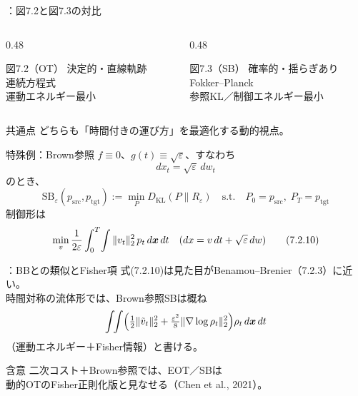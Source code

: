\begin{frame}{\supplmark：図7.2と図7.3の対比}
    \begin{columns}[T,onlytextwidth]
        \begin{column}{0.48\textwidth}
            \begin{block}{図7.2（OT）}
                決定的・直線軌跡\\
                連続方程式\\
                運動エネルギー最小
            \end{block}
        \end{column}
        \begin{column}{0.48\textwidth}
            \begin{block}{図7.3（SB）}
                確率的・揺らぎあり\\
                Fokker--Planck\\
                参照KL／制御エネルギー最小
            \end{block}
        \end{column}
    \end{columns}
    \vspace{0.4em}
    \begin{exampleblock}{共通点}
        どちらも「時間付きの運び方」を最適化する動的視点。
    \end{exampleblock}
\end{frame}
\asmain
\begin{frame}{特殊例：Brown参照}
    $f\equiv 0$、$g(t)\equiv\sqrt{\varepsilon}$、すなわち
    \[
        dx_{t}=\sqrt{\varepsilon}\,dw_{t}
    \]
    のとき、
    \[
        \mathrm{SB}_{\varepsilon}(p_{\mathrm{src}},p_{\mathrm{tgt}})
        :=
        \min_{P}
        D_{\mathrm{KL}}(P\|R_{\varepsilon})
        \quad\text{s.t.}\quad
        P_{0}=p_{\mathrm{src}},\;
        P_{T}=p_{\mathrm{tgt}}
        \tag{7.2.9}
    \]
    制御形は
    \[
        \min_{v}
        \frac{1}{2\varepsilon}
        \int_{0}^{T}\!\int \|v_{t}\|_{2}^{2}\,p_{t}\,d\bm{x}\,dt
        \quad
        (dx=v\,dt+\sqrt{\varepsilon}\,dw)
        \tag{7.2.10}
    \]
\end{frame}
\assuppl
\begin{frame}{\supplmark：BBとの類似とFisher項}
    式(7.2.10)は見た目がBenamou--Brenier（7.2.3）に近い。\\
    時間対称の流体形では、Brown参照SBは概ね
    \[
        \int\!\!\int
        \Bigl(
        \tfrac12\|\tilde{v}_{t}\|_{2}^{2}
        +
        \tfrac{\varepsilon^{2}}{8}\|\nabla\log\rho_{t}\|_{2}^{2}
        \Bigr)
        \rho_{t}\,d\bm{x}\,dt
    \]
    （運動エネルギー＋Fisher情報）と書ける。
    \begin{exampleblock}{含意}
        二次コスト＋Brown参照では、EOT／SBは\\
        動的OTのFisher正則化版と見なせる（Chen et al., 2021）。
    \end{exampleblock}
\end{frame}
